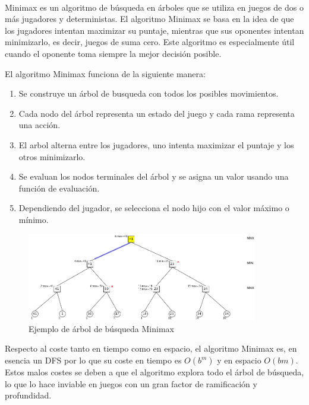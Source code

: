 \documentclass{report}
\begin{document}
          \paragraph*{}{
            Minimax es un algoritmo de búsqueda en árboles que se utiliza en juegos de dos o más jugadores y deterministas.
            El algoritmo Minimax se basa en la idea de que los jugadores intentan maximizar su puntaje, mientras que sus oponentes intentan minimizarlo, es decir, juegos de suma cero.
            Este algoritmo es especialmente útil cuando el oponente toma siempre la mejor decisión posible.

            El algoritmo Minimax funciona de la siguiente manera:
            \begin{enumerate}
                \item Se construye un árbol de busqueda con todos los posibles movimientos.
                \item Cada nodo del árbol representa un estado del juego y cada rama representa una acción.
                \item El arbol alterna entre los jugadores, uno intenta maximizar el puntaje y los otros minimizarlo.
                \item Se evaluan los nodos terminales del árbol y se asigna un valor usando una función de evaluación.
                \item Dependiendo del jugador, se selecciona el nodo hijo con el valor máximo o mínimo.
            \end{enumerate}
            \begin{figure}[H]
                \centering
                \includegraphics[width=0.9\textwidth]{./.img/minimax.png}
                \caption{Ejemplo de árbol de búsqueda Minimax}
            \end{figure}
            
            Respecto al coste tanto en tiempo como en espacio, el algoritmo Minimax es, en esencia un DFS por lo que su coste en tiempo es $O(b^m)$ y en espacio $O(bm)$. 
            Estos malos costes se deben a que el algoritmo explora todo el árbol de búsqueda, lo que lo hace inviable en juegos con un gran factor de ramificación y profundidad.
          }
\end{document}
